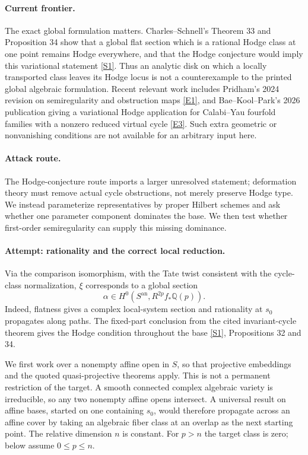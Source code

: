 \documentclass[11pt,a4paper]{article}
\newcommand{\Q}{\mathbb{Q}}
\newcommand{\sref}[2]{\hyperlink{source:#1:#2}{[S#2]}}
\newcommand{\eref}[2]{\hyperlink{extra:#1:#2}{[E#2]}}
\numberwithin{equation}{section}
\begin{document}
\paragraph{Current frontier.}
The exact global formulation matters. Charles--Schnell's Theorem 33 and
Proposition 34 show that a global flat section which is a rational Hodge
class at one point remains Hodge everywhere, and that the Hodge conjecture
would imply this variational statement \sref{statement}{1}. Thus an analytic
disk on which a locally transported class leaves its Hodge locus is not a
counterexample to the printed global algebraic formulation. Recent relevant
work includes Pridham's 2024 revision on semiregularity and obstruction
maps \eref{statement}{1}, and Bae--Kool--Park's 2026 publication giving a
variational Hodge application for Calabi--Yau fourfold families with a
nonzero reduced virtual cycle \eref{statement}{3}. Such extra geometric or
nonvanishing conditions are not available for an arbitrary input here.

\paragraph{Attack route.}
The Hodge-conjecture route imports a larger unresolved statement; deformation
theory must remove actual cycle obstructions, not merely preserve Hodge type.
We instead parameterize representatives by proper Hilbert schemes and ask
whether one parameter component dominates the base. We then test whether
first-order semiregularity can supply this missing dominance.

\paragraph{Attempt: rationality and the correct local reduction.}
Via the comparison isomorphism, with the Tate twist consistent with the
cycle-class normalization, $\xi$ corresponds to a global section
\[
 \alpha\in H^0(S^{\mathrm{an}},R^{2p}f_*\Q(p)).
\]
Indeed, flatness gives a complex local-system section and rationality at
$s_0$ propagates along paths. The fixed-part conclusion from the cited
invariant-cycle theorem gives the Hodge condition throughout the base
\sref{statement}{1}, Propositions 32 and 34.

We first work over a nonempty affine open in $S$, so that projective
embeddings and the quoted quasi-projective theorems apply. This is not a
permanent restriction of the target. A smooth connected complex algebraic
variety is irreducible, so any two nonempty affine opens intersect. A
universal result on affine bases, started on one containing $s_0$, would
therefore propagate across an affine cover by taking an algebraic fiber
class at an overlap as the next starting point. The relative dimension
$n$ is constant. For $p>n$ the target class is zero; below assume
$0\le p\le n$.
\end{document}
